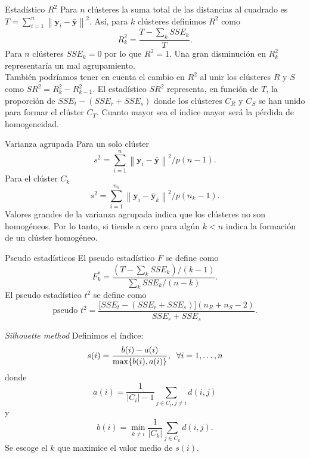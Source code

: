 \documentclass[spanish]{beamer}
\newcommand{\norm}[1]{\left\lVert#1\right\rVert}
\newcommand{\yy}{\textbf{y}}
\begin{document}
\begin{frame}{Estadístico $ R^2 $}
	Para $ n $ clústeres la suma total de las distancias al cuadrado es $ T = \sum_{i = 1}^{n} \norm{\yy_i - \bar{\yy}}^2 $. Así, para $ k $ clústeres definimos $ R^2 $ como
	\[
	R^{2}_{k} = \frac{T - \sum_k SSE_k}{T}.
	\]
	Para $ n $ clústeres $ SSE_k = 0 $ por lo que $ R^2 = 1 $. Una gran disminución en $ R^2_k $ representaría un mal agrupamiento. \\
	También podríamos tener en cuenta el cambio en $ R^2 $ al unir los clústeres $ R $ y $ S $ como $ SR^2 = R_k^2 - R^2_{k-1} $. El estadístico $ SR^2 $ representa, en función de $ T $, la proporción de $ SSE_t - (SSE_r + SSE_s) $ donde los clústeres $ C_R $ y $ C_S $ se han unido para formar el clúster $ C_T $.  Cuanto mayor sea el índice mayor será la pérdida de homogeneidad.
\end{frame}

\begin{frame}{Varianza agrupada}
	Para un solo clúster \[ s^2 = \sum_{i=1}^{n} \norm{\yy_i - \bar{\yy}}^2/ p(n-1).\]
	Para el clúster $ C_k $
	\[
	s^2 = \sum_{i=1}^{n_k} \norm{\yy_i - \bar{\yy}_k}^2/ p(n_k-1).
	\]
	Valores grandes de la varianza agrupada indica que los clústeres no son homogéneos. Por lo tanto, si tiende a cero para algún $  k < n $ indica la formación de un clúster homogéneo.
\end{frame}

\begin{frame}{Pseudo estadísticos}
	El pseudo estadístico $ F $ se define como
	\[
	F^*_k = \frac{(T-\sum_k SSE_k) / (k-1)}{\sum_k SSE_k / (n-k)}.
	\]
	El pseudo estadístico $ t^2 $ se define como
	\[
	\text{pseudo }t^2 = \frac{\lbrack SSE_t - (SSE_r + SSE_s)\rbrack(n_R + n_S - 2)}{SSE_r + SSE_s}.
	\]
\end{frame}

\begin{frame}{\textit{Silhouette method}}
	Definimos el índice:
	\[
	s(i) = \frac{b(i)-a(i)}{\max\{b(i), a(i)\}}, \hspace{2mm} \forall i = 1, \dots, n
	\] 
	donde 
	\[
	a(i) = \frac{1}{|C_i|-1}\sum_{j\in C_i, j \neq i} d(i,j) 
	\]	y
	\[
	b(i) = \min_{k \neq i} \frac{1}{|C_k|} \sum_{j \in C_k} d(i,j).
	\] 
	Se escoge el $ k $ que maximice el valor medio de $ s(i) $.
\end{frame}
\end{document}
